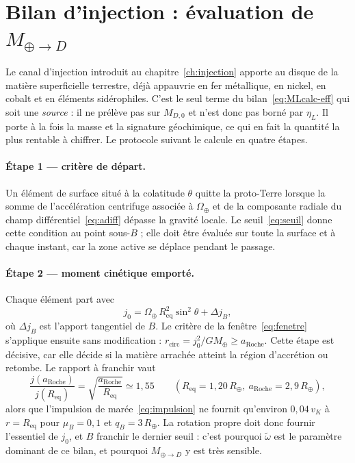 \documentclass[11pt,a4paper,openany]{report}
\newcommand{\Mt}{M_{\oplus}}
\newcommand{\Rt}{R_{\oplus}}
\newcommand{\Req}{R_{\mathrm{eq}}}
\newcommand{\aR}{a_{\mathrm{Roche}}}
\begin{document}
\section{Bilan d'injection : évaluation de \texorpdfstring{$M_{\oplus\to D}$}{M_Terre-vers-D}}
\label{sec:bilan-injection}

Le canal d'injection introduit au chapitre~\ref{ch:injection} apporte au disque de la matière
superficielle terrestre, déjà appauvrie en fer métallique, en nickel, en cobalt et en éléments
sidérophiles. C'est le seul terme du bilan~\eqref{eq:MLcalc-eff} qui soit une \emph{source} : il ne
prélève pas sur $M_{D,0}$ et n'est donc pas borné par $\eta_L$. Il porte à la fois la masse et la
signature géochimique, ce qui en fait la quantité la plus rentable à chiffrer. Le protocole suivant
le calcule en quatre étapes.

\paragraph{Étape 1 — critère de départ.} Un élément de surface situé à la colatitude $\theta$ quitte
la proto-Terre lorsque la somme de l'accélération centrifuge associée à $\Omega_\oplus$ et de la
composante radiale du champ différentiel~\eqref{eq:adiff} dépasse la gravité locale. Le seuil~\eqref{eq:seuil} donne cette condition au point sous-$B$ ; elle doit être évaluée sur toute la
surface et à chaque instant, car la zone active se déplace pendant le passage.

\paragraph{Étape 2 — moment cinétique emporté.} Chaque élément part avec
\begin{equation}
j_0=\Omega_\oplus\,\Req^2\sin^2\theta+\Delta j_B,
\label{eq:j0-injection}
\end{equation}
où $\Delta j_B$ est l'apport tangentiel de $B$. Le critère de la fenêtre~\eqref{eq:fenetre}
s'applique ensuite sans modification : $r_{\mathrm{circ}}=j_0^2/G\Mt\ge\aR$. Cette étape est
décisive, car elle décide si la matière arrachée atteint la région d'accrétion ou retombe. Le
rapport à franchir vaut
\begin{equation}
\frac{j(\aR)}{j(\Req)}=\sqrt{\frac{\aR}{\Req}}\simeq1{,}55
\qquad(\Req=1{,}20\,\Rt,\ \aR=2{,}9\,\Rt),
\label{eq:saut-j}
\end{equation}
alors que l'impulsion de marée~\eqref{eq:impulsion} ne fournit qu'environ
$0{,}04\,v_K$ à $r=\Req$ pour $\mu_B=0{,}1$ et $q_B=3\,\Rt$. La rotation propre doit donc fournir
l'essentiel de $j_0$, et $B$ franchir le dernier seuil : c'est pourquoi $\tilde\omega$ est le
paramètre dominant de ce bilan, et pourquoi $M_{\oplus\to D}$ y est très sensible.
\end{document}
